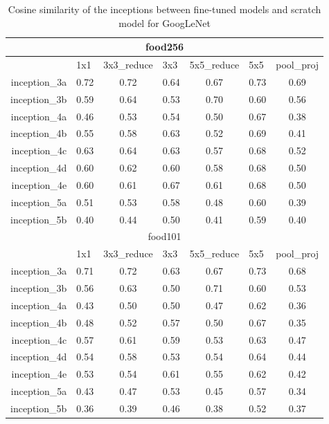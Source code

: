 \begin{table}[htbp]
  \centering
  \caption{Cosine similarity of the inceptions between fine-tuned models and scratch model for GoogLeNet}
    \begin{tabular}{r|cccccc}
    \toprule
    \multicolumn{7}{c}{food256} \\
    \midrule
          & \multicolumn{1}{l}{1x1} & \multicolumn{1}{l}{3x3\_reduce} & \multicolumn{1}{l}{3x3} & \multicolumn{1}{l}{5x5\_reduce} & \multicolumn{1}{l}{5x5} & \multicolumn{1}{l}{pool\_proj } \\
    inception\_3a & 0.72  & 0.72  & 0.64  & 0.67  & 0.73  & 0.69 \\
    inception\_3b & 0.59  & 0.64  & 0.53  & 0.70  & 0.60  & 0.56 \\
    inception\_4a & 0.46  & 0.53  & 0.54  & 0.50  & 0.67  & 0.38 \\
    inception\_4b & 0.55  & 0.58  & 0.63  & 0.52  & 0.69  & 0.41 \\
    inception\_4c & 0.63  & 0.64  & 0.63  & 0.57  & 0.68  & 0.52 \\
    inception\_4d & 0.60  & 0.62  & 0.60  & 0.58  & 0.68  & 0.50 \\
    inception\_4e & 0.60  & 0.61  & 0.67  & 0.61  & 0.68  & 0.50 \\
    inception\_5a & 0.51  & 0.53  & 0.58  & 0.48  & 0.60  & 0.39 \\
    inception\_5b & 0.40  & 0.44  & 0.50  & 0.41  & 0.59  & 0.40 \\  \toprule
    \multicolumn{7}{c}{food101} \\ \midrule
          & \multicolumn{1}{l}{1x1 } & \multicolumn{1}{l}{3x3\_reduce} & \multicolumn{1}{l}{3x3} & \multicolumn{1}{l}{5x5\_reduce} & \multicolumn{1}{l}{5x5} & \multicolumn{1}{l}{pool\_proj } \\
    inception\_3a & 0.71  & 0.72  & 0.63  & 0.67  & 0.73  & 0.68 \\
    inception\_3b & 0.56  & 0.63  & 0.50  & 0.71  & 0.60  & 0.53 \\
    inception\_4a & 0.43  & 0.50  & 0.50  & 0.47  & 0.62  & 0.36 \\
    inception\_4b & 0.48  & 0.52  & 0.57  & 0.50  & 0.67  & 0.35 \\
    inception\_4c & 0.57  & 0.61  & 0.59  & 0.53  & 0.63  & 0.47 \\
    inception\_4d & 0.54  & 0.58  & 0.53  & 0.54  & 0.64  & 0.44 \\
    inception\_4e & 0.53  & 0.54  & 0.61  & 0.55  & 0.62  & 0.42 \\
    inception\_5a & 0.43  & 0.47  & 0.53  & 0.45  & 0.57  & 0.34 \\
    inception\_5b & 0.36  & 0.39  & 0.46  & 0.38  & 0.52  & 0.37 \\
    \bottomrule
    \end{tabular}%
  \label{tab:cosg}%
\end{table}%


